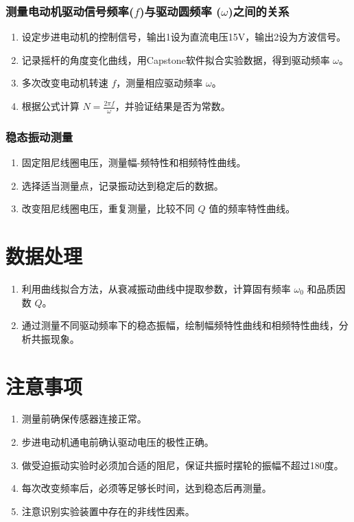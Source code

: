 \documentclass[UTF8]{ctexart}
\begin{document}
\subsubsection{测量电动机驱动信号频率($f$)与驱动圆频率 ($\omega$)之间的关系}
\begin{enumerate}
    \item 设定步进电动机的控制信号，输出1设为直流电压15V，输出2设为方波信号。
    \item 记录摇杆的角度变化曲线，用Capstone软件拟合实验数据，得到驱动频率 $\omega$。
    \item 多次改变电动机转速 $f$，测量相应驱动频率 $\omega$。
    \item 根据公式计算 $N = \frac{2\pi f}{\omega}$，并验证结果是否为常数。
\end{enumerate}

\subsubsection{稳态振动测量}
\begin{enumerate}
    \item 固定阻尼线圈电压，测量幅-频特性和相频特性曲线。
    \item 选择适当测量点，记录振动达到稳定后的数据。
    \item 改变阻尼线圈电压，重复测量，比较不同 $Q$ 值的频率特性曲线。
\end{enumerate}

\section{数据处理}
\begin{enumerate}
    \item 利用曲线拟合方法，从衰减振动曲线中提取参数，计算固有频率 $\omega_0$ 和品质因数 $Q$。
    \item 通过测量不同驱动频率下的稳态振幅，绘制幅频特性曲线和相频特性曲线，分析共振现象。
\end{enumerate}

\section{注意事项}
\begin{enumerate}
    \item 测量前确保传感器连接正常。
    \item 步进电动机通电前确认驱动电压的极性正确。
    \item 做受迫振动实验时必须加合适的阻尼，保证共振时摆轮的振幅不超过180度。
    \item 每次改变频率后，必须等足够长时间，达到稳态后再测量。
    \item 注意识别实验装置中存在的非线性因素。
\end{enumerate}





\end{document}
